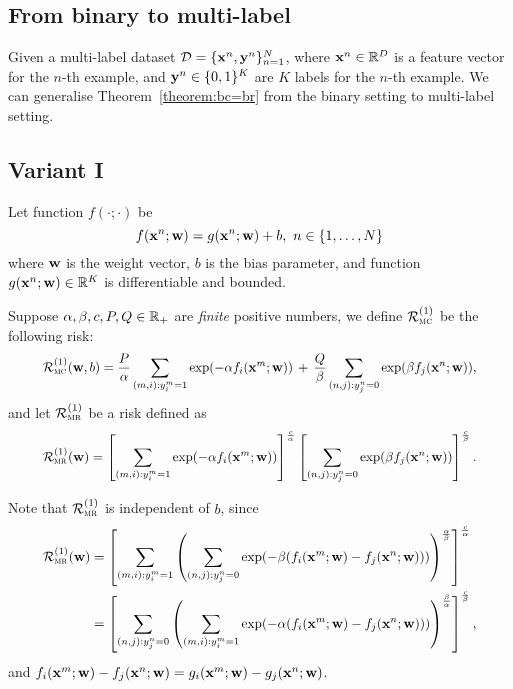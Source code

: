 \subsection{From binary to multi-label}
\label{ssec:ml}

Given a multi-label dataset $\mathcal{D} = \{\mathbf{x}^n, \mathbf{y}^n\}_{n=1}^N$, where $\mathbf{x}^n \in \mathbb{R}^D$ is a feature vector for the $n$-th example,
and $\mathbf{y}^n \in \{0,1\}^K$ are $K$ labels for the $n$-th example.
We can generalise Theorem~\ref{theorem:bc=br} from the binary setting to multi-label setting.

\subsection{Variant I}

Let function $f(\cdot; \cdot)$ be
$$
f(\mathbf{x}^n; \mathbf{w}) = g(\mathbf{x}^n; \mathbf{w}) + b, \ n \in \{1,\dots,N\}
$$
where $\mathbf{w}$ is the weight vector, $b$ is the bias parameter,
and function $g(\mathbf{x}^n; \mathbf{w}) \in \mathbb{R}^K$ is differentiable and bounded.

Suppose $\alpha, \beta, c, P, Q \in \mathbb{R}_+$ are \emph{finite} positive numbers, 
we define $\mathcal{R}_\textsc{mc}^{({1})}$ be the following risk:
\begin{equation}
\label{eq:mc1}
\resizebox{.9\linewidth}{!}{$
\displaystyle
\RCal_\textsc{mc}\pb{1}(\w, b) 
= \frac{P}{\alpha} \sum_{(m,i): y_i^m = 1} \exp(-\alpha f_i(\x^m; \w)) \, + \,
  \frac{Q}{\beta}  \sum_{(n,j): y_j^n = 0} \exp( \beta  f_j(\x^n; \w)),
$}
\end{equation}
and let $\mathcal{R}_\textsc{mr}^{({1})}$ be a risk defined as
\begin{equation}
\label{eq:mr1}
\resizebox{.9\linewidth}{!}{$
\displaystyle
\RCal_\textsc{mr}\pb{1}(\w) 
= \left[ \sum_{(m,i): y_i^m = 1} \exp(-\alpha f_i(\x^m; \w)) \right]^\frac{c}{\alpha}  
  \left[ \sum_{(n,j): y_j^n = 0} \exp( \beta  f_j(\x^n; \w)) \right]^\frac{c}{\beta}.
$}
\end{equation}

Note that $\mathcal{R}_\textsc{mr}^{({1})}$ is independent of $b$, since
\begin{equation}
\label{eq:mr_derive}
\resizebox{.9\linewidth}{!}{$
\displaystyle
\begin{aligned}
\RCal_\textsc{mr}\pb{1}(\w) 
&= \left[ \sum_{(m,i): y_i^m = 1} \left( \sum_{(n,j): y_j^n = 0} 
   \exp(-\beta(f_i(\x^m; \w) - f_j(\x^n; \w) ) ) \right)^\frac{\alpha}{\beta} \right]^\frac{c}{\alpha} \\
&= \left[ \sum_{(n,j): y_j^n = 0} \left( \sum_{(m,i): y_i^m = 1} 
   \exp(-\alpha( f_i(\x^m; \w) - f_j(\x^n; \w) ) ) \right)^\frac{\beta}{\alpha} \right]^\frac{c}{\beta},
\end{aligned}
$}
\end{equation}
and $f_i(\mathbf{x}^m; \mathbf{w}) - f_j(\mathbf{x}^n; \mathbf{w}) = g_i(\mathbf{x}^m; \mathbf{w}) - g_j(\mathbf{x}^n; \mathbf{w})$.


